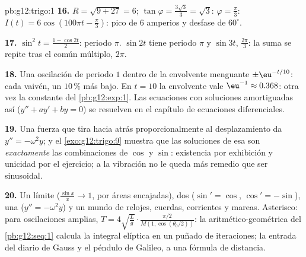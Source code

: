\begin{solution}{pb:g12:trigo:1}
\textbf{16.} $R = \sqrt{9 + 27} = 6$;
$\tan\varphi = \frac{3\sqrt3}{3} = \sqrt3$: $\varphi = \frac\pi3$:
$I(t) = 6\cos\left(100\pi t - \frac\pi3\right)$: pico de $6$ amperios y
desfase de $60^\circ$.

\textbf{17.} $\sin^2 t = \frac{1 - \cos 2t}{2}$: periodo $\pi$.
$\sin 2t$ tiene periodo $\pi$ y $\sin 3t$, $\frac{2\pi}{3}$: la suma se
repite tras el  común múltiplo, $2\pi$.

\textbf{18.} Una oscilación de periodo $1$ dentro de la envolvente
menguante $\pm\eu^{-t/10}$: cada vaivén, un $10\,\%$ más bajo. En $t = 10$
la envolvente vale $\eu^{-1} \approx 0.368$: otra vez la constante del
\cref{pb:g12:exp:1}. Las ecuaciones con soluciones amortiguadas así
($y'' + a y' + b y = 0$) se resuelven en el capítulo de ecuaciones
diferenciales.

\textbf{19.} Una fuerza que tira hacia atrás proporcionalmente al
desplazamiento da $y'' = -\omega^2 y$; y el \cref{exo:g12:trigo:9} muestra
que las soluciones de esa  son \emph{exactamente} las combinaciones
de $\cos$ y $\sin$: existencia por exhibición y unicidad por el ejercicio;
a la vibración no le queda más remedio que ser sinusoidal.

\textbf{20.} Un límite ($\frac{\sin x}{x} \to 1$, por áreas encajadas), dos
 ($\sin' = \cos$, $\cos' = -\sin$), una 
($y'' = -\omega^2 y$) y un mundo de relojes, cuerdas, corrientes y mareas.
Asterisco: para oscilaciones amplias,
$T = 4\sqrt{\frac Lg} \cdot \frac{\pi/2}{M(1, \cos(\theta_0/2))}$: la 
aritmético-geométrica del \cref{pb:g12:seq:1} calcula la integral elíptica
en un puñado de iteraciones; la entrada del diario de Gauss y el péndulo de
Galileo, a una fórmula de distancia.
\end{solution}
